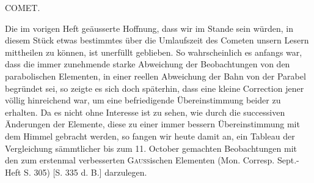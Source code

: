 \par{}\bigskip
\hypertarget{native-343-lower}{}\label{native-343-lower}
\begin{center}
\large COMET.
\end{center}

\par\indent Die im vorigen Heft geäusserte Hoffnung, dass wir im Stande sein würden, in diesem Stück etwas bestimmtes über die Umlaufszeit des Cometen unsern Lesern mittheilen zu können, ist unerfüllt geblieben. So wahrscheinlich es anfangs war, dass die immer zunehmende starke Abweichung der Beobachtungen von den parabolischen Elementen, in einer reellen Abweichung der Bahn von der Parabel begründet sei, so zeigte es sich doch späterhin, dass eine kleine Correction jener völlig hinreichend war, um eine befriedigende Übereinstimmung beider zu erhalten. Da es nicht ohne Interesse ist zu sehen, wie durch die successiven Änderungen der Elemente, diese zu einer immer bessern Übereinstimmung mit dem Himmel gebracht werden, so fangen wir heute damit an, ein Tableau der Vergleichung sämmtlicher bis zum 11. October gemachten Beobachtungen mit den zum erstenmal verbesserten \textsc{Gauss}ischen Elementen (Mon. Corresp. Sept.-Heft S. 305) [S. 335 d. B.] darzulegen.

